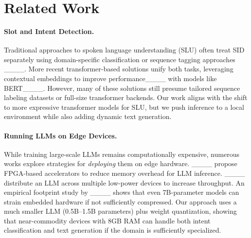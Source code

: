 \section{Related Work}
\paragraph{Slot and Intent Detection.}
Traditional approaches to spoken language understanding (SLU) often treat SID separately using domain-specific classification or sequence tagging approaches ____. More recent transformer-based solutions unify both tasks, leveraging contextual embeddings to improve performance____ with models like BERT____. However, many of these solutions still presume tailored sequence labeling datasets or full-size transformer backends. Our work aligns with the shift to more expressive transformer models for SLU, but we push inference to a local environment while also adding dynamic text generation.

\paragraph{Running LLMs on Edge Devices.}
While training large-scale LLMs remains computationally expensive, numerous works explore strategies for \emph{deploying} them on edge hardware. ____ propose FPGA-based accelerators to reduce memory overhead for LLM inference. ____ distribute an LLM across multiple low-power devices to increase throughput. An empirical footprint study by ____ shows that even 7B-parameter models can strain embedded hardware if not sufficiently compressed. Our approach uses a much smaller LLM (0.5B--1.5B parameters) plus weight quantization, showing that near-commodity devices with 8GB RAM can handle both intent classification and text generation if the domain is sufficiently specialized.